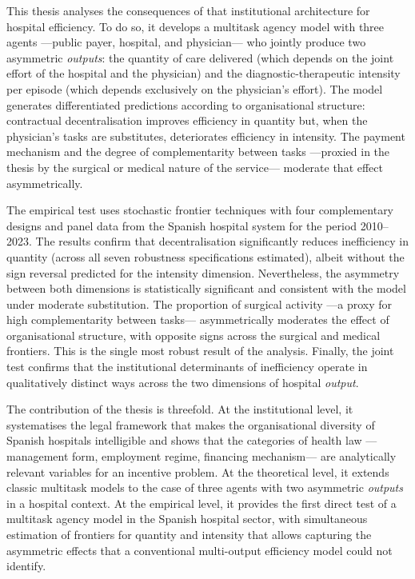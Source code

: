 This thesis analyses the consequences of that institutional 
architecture for hospital efficiency. To do so, it develops a 
multitask agency model with three agents ---public payer, hospital, 
and physician--- who jointly produce two asymmetric \textit{outputs}: 
the quantity of care delivered (which depends on the joint effort 
of the hospital and the physician) and the diagnostic-therapeutic 
intensity per episode (which depends exclusively on the physician's 
effort). The model generates differentiated predictions according 
to organisational structure: contractual decentralisation improves 
efficiency in quantity but, when the physician's tasks are 
substitutes, deteriorates efficiency in intensity. The payment 
mechanism and the degree of complementarity between tasks ---proxied 
in the thesis by the surgical or medical nature of the service--- 
moderate that effect asymmetrically.

The empirical test uses stochastic frontier techniques with four 
complementary designs and panel data from the Spanish hospital 
system for the period 2010--2023. The results confirm that 
decentralisation significantly reduces inefficiency in quantity 
(across all seven robustness specifications estimated), albeit 
without the sign reversal predicted for the intensity dimension. 
Nevertheless, the asymmetry between both dimensions is statistically 
significant and consistent with the model under moderate substitution. 
The proportion of surgical activity ---a proxy for high 
complementarity between tasks--- asymmetrically moderates the 
effect of organisational structure, with opposite signs across 
the surgical and medical frontiers. This is the single most robust 
result of the analysis. Finally, the joint test confirms that the 
institutional determinants of inefficiency operate in qualitatively 
distinct ways across the two dimensions of hospital \textit{output}.

The contribution of the thesis is threefold. At the institutional 
level, it systematises the legal framework that makes the 
organisational diversity of Spanish hospitals intelligible and 
shows that the categories of health law ---management form, 
employment regime, financing mechanism--- are analytically relevant 
variables for an incentive problem. At the theoretical level, it 
extends classic multitask models to the case of three agents with 
two asymmetric \textit{outputs} in a hospital context. At the 
empirical level, it provides the first direct test of a multitask 
agency model in the Spanish hospital sector, with simultaneous 
estimation of frontiers for quantity and intensity that allows 
capturing the asymmetric effects that a conventional multi-output 
efficiency model could not identify.


